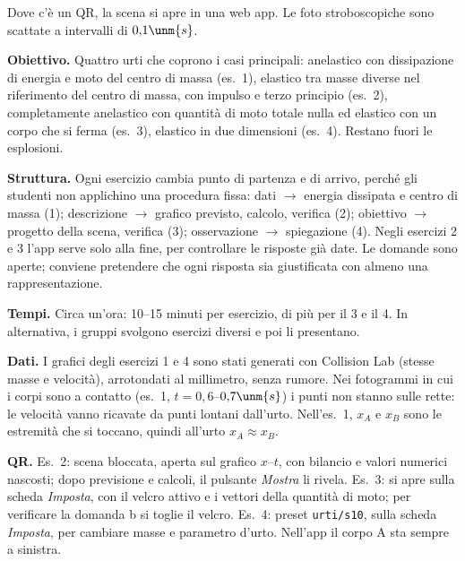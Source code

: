 \documentclass[10pt]{article}
\begin{document}
\par
\vspace{.4em}\noindent{\color{black!45}\rule{\textwidth}{.4pt}}\par\vspace{.4em}

\noindent Dove c'è un QR, la scena si apre in una web app. Le foto stroboscopiche sono scattate a intervalli di $0{,}1\unm{s}$.\par

\begin{solution}
\textbf{Obiettivo.} Quattro urti che coprono i casi principali: anelastico con dissipazione di
energia e moto del centro di massa (es.~1), elastico tra masse diverse nel riferimento del centro
di massa, con impulso e terzo principio (es.~2), completamente anelastico con quantità di moto
totale nulla ed elastico con un corpo che si ferma (es.~3), elastico in due dimensioni (es.~4).
Restano fuori le esplosioni.

\textbf{Struttura.} Ogni esercizio cambia punto di partenza e di arrivo, perché gli studenti non
applichino una procedura fissa: dati $\to$ energia dissipata e centro di massa (1); descrizione
$\to$ grafico previsto, calcolo, verifica (2); obiettivo $\to$ progetto della scena, verifica (3);
osservazione $\to$ spiegazione (4). Negli esercizi 2 e 3 l'app serve solo alla fine, per
controllare le risposte già date. Le domande sono aperte; conviene pretendere che ogni risposta
sia giustificata con almeno una rappresentazione.

\textbf{Tempi.} Circa un'ora: 10--15 minuti per esercizio, di più per il 3 e il 4. In
alternativa, i gruppi svolgono esercizi diversi e poi li presentano.

\textbf{Dati.} I grafici degli esercizi 1 e 4 sono stati generati con Collision Lab (stesse
masse e velocità), arrotondati al millimetro, senza rumore. Nei fotogrammi in cui i corpi sono a
contatto (es.~1, $t = 0{,}6$--$0{,}7\unm{s}$) i punti non stanno sulle rette: le velocità vanno
ricavate da punti lontani dall'urto. Nell'es.~1, $x_A$ e $x_B$ sono le estremità che si toccano,
quindi all'urto $x_A \approx x_B$.

\textbf{QR.} Es.~2: scena bloccata, aperta sul grafico $x$--$t$, con bilancio e valori numerici
nascosti; dopo previsione e calcoli, il pulsante \emph{Mostra} li rivela. Es.~3: si apre sulla
scheda \emph{Imposta}, con il velcro attivo e i vettori della quantità di moto; per verificare la
domanda b si toglie il velcro. Es.~4: preset \texttt{urti/s10}, sulla scheda \emph{Imposta}, per
cambiare masse e parametro d'urto. Nell'app il corpo A sta sempre a sinistra.
\end{solution}
\end{document}

